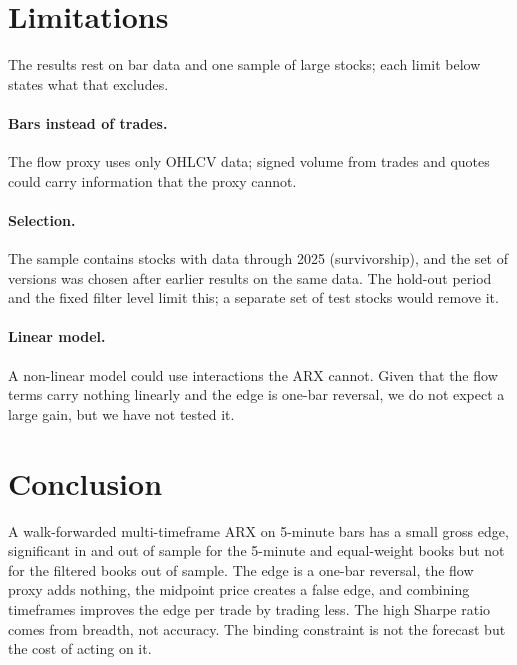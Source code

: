 \documentclass[11pt,a4paper]{article}
\begin{document}
\section{Limitations}
\label{sec:limits}

The results rest on bar data and one sample of large stocks; each limit below states what that excludes.


\paragraph{Bars instead of trades.} The flow proxy uses only OHLCV data; signed volume from trades and
quotes \citep{lee1991} could carry information that the proxy cannot.

\paragraph{Selection.} The sample contains stocks with data through 2025 (survivorship), and the set of
versions was chosen after earlier results on the same data. The hold-out period and the fixed filter
level limit this; a separate set of test stocks would remove it.

\paragraph{Linear model.} A non-linear model could use interactions the ARX cannot. Given that the flow
terms carry nothing linearly and the edge is one-bar reversal, we do not expect a large gain, but we have
not tested it.

\section{Conclusion}

A walk-forwarded multi-timeframe ARX on 5-minute bars has a small gross edge, significant in and out of sample for
the 5-minute and equal-weight books but not for the filtered books out of sample. The edge
is a one-bar reversal, the flow proxy adds nothing, the midpoint price creates a false edge, and combining
timeframes improves the edge per trade by trading less. The high Sharpe ratio comes from breadth, not
accuracy. The binding constraint is not the forecast but the cost of acting on it.
\end{document}
